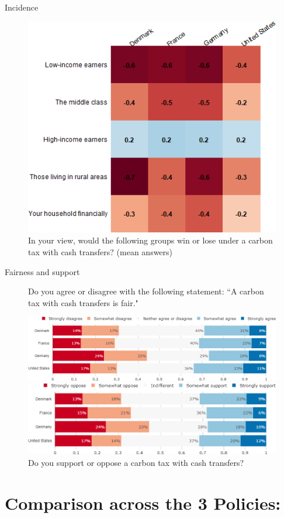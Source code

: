 \documentclass[aspectratio=169,9pt,dvipsnames]{beamer}
\begin{document}
\begin{frame}{Incidence}%
\begin{figure}[h!]
\centering
\caption{In your view, would the following groups win or lose under a carbon tax with cash transfers? (mean answers)}
\includegraphics[width=.45\textwidth]{../figures/country_comparison/tax_transfers_win_lose_mean_countries.png}
\end{figure}
\end{frame}


\begin{frame}{Fairness and support}%
\begin{figure}[h!]
\centering
\caption{Do you agree or disagree with the following statement: ``A carbon tax with cash transfers is fair."}
\includegraphics[width=.7\textwidth]{../figures/country_comparison/tax_transfers_fair_countries.png}
\vspace{.5cm}
\centering
\caption{Do you support or oppose a carbon tax with cash transfers?}
\includegraphics[width=.7\textwidth]{../figures/country_comparison/tax_transfers_support_countries.png}
\end{figure}

\end{frame}

\section{Comparison across the 3 Policies:}
\end{document}
